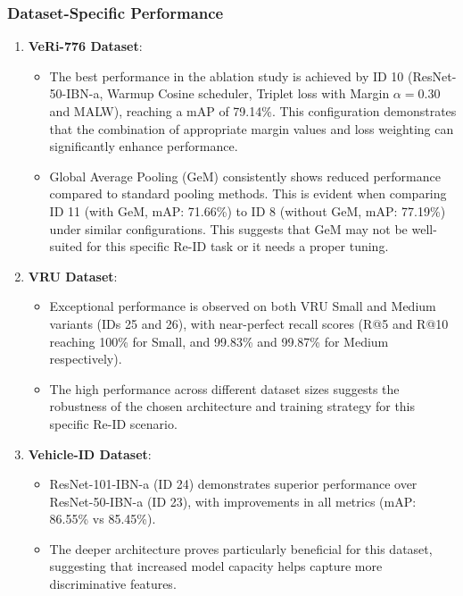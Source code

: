 \subsubsection{Dataset-Specific Performance}
\begin{enumerate}
    \item \textbf{VeRi-776 Dataset}:
    \begin{itemize}
        \item The best performance in the ablation study is achieved by ID 10 (ResNet-50-IBN-a, Warmup Cosine scheduler, Triplet loss with Margin $\alpha = 0.30$ and MALW), reaching a mAP of 79.14\%. This configuration demonstrates that the combination of appropriate margin values and loss weighting can significantly enhance performance.
        \item Global Average Pooling (GeM) consistently shows reduced performance compared to standard pooling methods. This is evident when comparing ID 11 (with GeM, mAP: 71.66\%) to ID 8 (without GeM, mAP: 77.19\%) under similar configurations. This suggests that GeM may not be well-suited for this specific Re-ID task or it needs a proper tuning.
    \end{itemize}
    
    \item \textbf{VRU Dataset}:
    \begin{itemize}
        \item Exceptional performance is observed on both VRU Small and Medium variants (IDs 25 and 26), with near-perfect recall scores (R@5 and R@10 reaching 100\% for Small, and 99.83\% and 99.87\% for Medium respectively).
        \item The high performance across different dataset sizes suggests the robustness of the chosen architecture and training strategy for this specific Re-ID scenario.
    \end{itemize}
    
    \item \textbf{Vehicle-ID Dataset}:
    \begin{itemize}
        \item ResNet-101-IBN-a (ID 24) demonstrates superior performance over ResNet-50-IBN-a (ID 23), with improvements in all metrics (mAP: 86.55\% vs 85.45\%).
        \item The deeper architecture proves particularly beneficial for this dataset, suggesting that increased model capacity helps capture more discriminative features.
    \end{itemize}
\end{enumerate}

